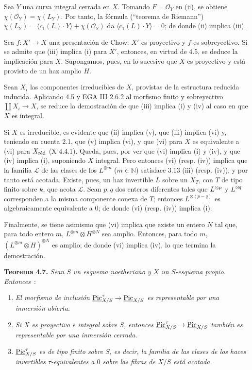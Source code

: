 Sea \(Y\) una curva integral cerrada en \(X\). Tomando
\(F=\mathcal O_Y\) en (ii), se obtiene
\(\chi(\mathcal O_Y)=\chi(L_Y)\). Por tanto, la fórmula (``teorema de
Riemann'')
\(\chi(L_Y)=\langle c_1(L)\cdot Y\rangle+\chi(\mathcal O_Y)\) da
\(\langle c_1(L)\cdot Y\rangle=0\); de donde (ii) implica (iii).

Sea \(f:X'\to X\) una presentación de Chow: \(X'\) es proyectivo y \(f\) es
sobreyectivo. Si se admite que (iii) implica (i) para \(X'\), entonces, en
virtud de 4.5, se deduce la implicación para \(X\). Supongamos, pues, en lo
sucesivo que \(X\) es proyectivo y está provisto de un haz amplio \(H\).

Sean \(X_i\) las componentes irreducibles de \(X\), provistas de la
estructura reducida inducida. Aplicando 4.5 y EGA III 2.6.2 al morfismo finito
y sobreyectivo \(\coprod X_i\to X\), se reduce la demostración de que (iii)
implica (i) y (iv) al caso en que \(X\) es integral.

Si \(X\) es irreducible, es evidente que (ii) implica (v), que (iii) implica
(vi) y, teniendo en cuenta 2.1, que (v) implica (vi), y que (vi) para \(X\)
es equivalente a (vi) para \(X_{\red}\) (X 4.4.1). Queda, pues, por ver que
(vi) implica (i) y (iv), y que (iv) implica (i), suponiendo \(X\) integral.
Pero entonces (vi) (resp. (iv)) implica que la familia \(\mathcal L\) de las
clases de los \(L^{\otimes m}\) (\(m\in\mathbb N\)) satisface 3.13 (iii)
(resp. (iv)), y por tanto está acotada. Existe, pues, un haz invertible \(L\)
sobre un \(X_T\), con \(T\) de tipo finito sobre \(k\), que acota
\(\mathcal L\). Sean \(p,q\) dos enteros diferentes tales que
\(L^{\otimes \sisi{r}{p}}\) y \(L^{\otimes q}\) corresponden a la misma componente %
conexa de \(T\); entonces \(L^{\otimes(p-q)}\) es algebraicamente equivalente
a \(0\); de donde (vi) (resp. (iv)) implica (i).

Finalmente, se tiene asimismo que (vi) implica que existe un entero \(N\) tal
que, para todo entero \(m\), \(L^{\otimes m}\otimes H^{\otimes N}\) sea
amplio. Entonces, para todo \(m\),
\((L^{\otimes m}\otimes H)^{\otimes N}\) es amplio; de donde (vi) implica
(iv), lo que termina la demostración.

\textbf{Teorema 4.7.} \emph{Sean \(S\) un esquema noetheriano y \(X\) un
\(S\)-esquema propio. Entonces}~:
\begin{enumerate}[label=(\roman*)]
\item \emph{El morfismo de inclusión
\(\underline{\Pic}^\tau_{X/S}\to\underline{\Pic}_{X/S}\) es representable
por una inmersión abierta.}
\item \emph{Si \(X\) es proyectivo e integral sobre \(S\), entonces
\(\underline{\Pic}^\tau_{X/S}\to\underline{\Pic}_{X/S}\) también es
representable por una inmersión cerrada.}
\item \emph{\(\underline{\Pic}^\tau_{X/S}\) es de tipo finito sobre \(S\),
es decir, la familia de las clases de los haces invertibles
\(\tau\)-equivalentes a \(0\) sobre las fibras de \(X/S\) está acotada.}
\end{enumerate}

